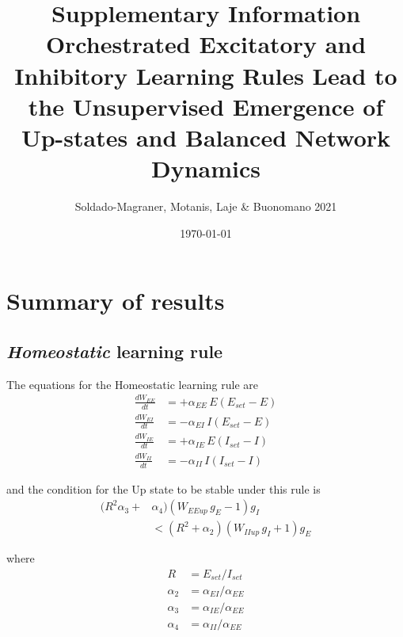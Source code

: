 \documentclass[
twocolumn,
]{article}
\newcommand{\EE}{\mathit{EE}}
\newcommand{\EI}{\mathit{EI}}
\newcommand{\IE}{\mathit{IE}}
\newcommand{\II}{\mathit{II}}
\newcommand{\set}{\mathit{set}}
\newcommand{\up}{\mathit{up}}
\begin{document}
\title{\vspace{-2.0cm}Supplementary Information\\{\bf Orchestrated Excitatory and Inhibitory Learning Rules Lead to the Unsupervised Emergence of Up-states and Balanced Network Dynamics}}
\author{Soldado-Magraner, Motanis, Laje \& Buonomano 2021}
\date{\today}

\maketitle

\tableofcontents

\section{Summary of results}

\subsection{{\em Homeostatic} learning rule}

The equations for the Homeostatic learning rule are
\begin{equation}
\begin{aligned}
\frac{dW_{\EE}}{dt} & = +\alpha_{\EE} \, E (E_{\set} - E) \\
\frac{dW_{\EI}}{dt} & = -\alpha_{\EI} \, I (E_{\set} - E) \\
\frac{dW_{\IE}}{dt} & = +\alpha_{\IE} \, E (I_{\set} - I) \\
\frac{dW_{\II}}{dt} & = -\alpha_{\II} \, I (I_{\set} - I)
\end{aligned}
\label{eq.SH_summary}
\end{equation}

\noindent and the condition for the Up state to be stable under this rule is
\begin{equation}
\begin{aligned}
(R^2 \alpha_3 + & \alpha_4)(W_{\EE\up} \, g_E  - 1)g_I \\
& < (R^2 + \alpha_2)(W_{\II\up} \, g_I + 1)g_E
\label{eq.SH_stable_cond_summary}
\end{aligned}
\end{equation}

\noindent where
\begin{displaymath}
\begin{aligned}
R & = E_{\set}/I_{\set} \\
\alpha_2 & = \alpha_{\EI}/\alpha_{\EE} \\
\alpha_3 & = \alpha_{\IE}/\alpha_{\EE} \\
\alpha_4 & = \alpha_{\II}/\alpha_{\EE}
\end{aligned}
\end{displaymath}
\end{document}
